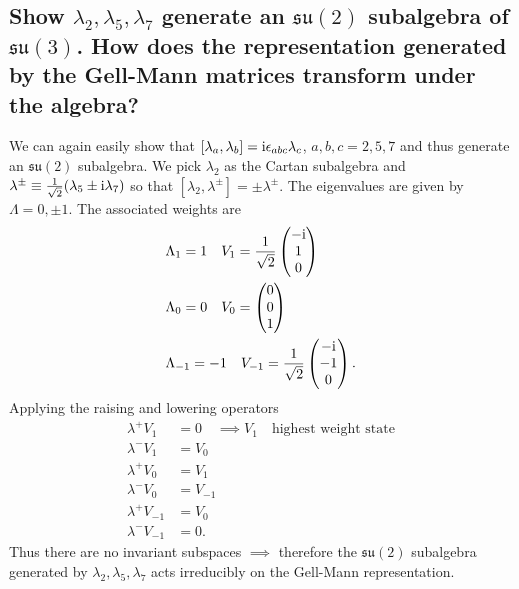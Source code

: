 \documentclass[main.tex]{subfiles}
\begin{document}
\subsection{Show $\lambda_2, \lambda_5, \lambda_7$ generate an $\mathfrak{su}(2)$ subalgebra of $\mathfrak{su}(3)$. How does the representation generated by the Gell-Mann matrices transform under the algebra?}
We can again easily show that $[\lambda_a,\lambda_b]=\mathrm{i} \epsilon_{abc}\lambda_c$, $a,b,c=2,5,7$ and thus generate an $\mathfrak{su}(2)$ subalgebra. We pick $\lambda_2$ as the Cartan subalgebra and $\lambda^{\pm}\equiv\frac{1}{\sqrt{2}}(\lambda_5\pm\mathrm{i}\lambda_7)$ so that $[\lambda_2,\lambda^{\pm}]=\pm\lambda^{\pm}$. The eigenvalues are given by $\Lambda=0,\pm1$. The associated weights are
\begin{align}
&\Lambda_1=1 \quad V_1= \frac{1}{\sqrt{2}}\begin{pmatrix}-\mathrm{i}\\1\\0\end{pmatrix}\\
&\Lambda_0=0 \quad V_0= \begin{pmatrix}0\\0\\1\end{pmatrix}\\
&\Lambda_{-1}=-1 \quad V_{-1}= \frac{1}{\sqrt{2}}\begin{pmatrix}-\mathrm{i}\\-1\\0\end{pmatrix}.
\end{align}
Applying the raising and lowering operators
\begin{align}
\lambda^+V_{1}&=0 \quad \implies V_{1} \quad\text{highest weight state}\\
\lambda^-V_{1}&=V_{0}\\
\lambda^+V_{0}&=V_{1}\\
\lambda^-V_{0}&=V_{-1}\\
\lambda^+V_{-1}&=V_{0}\\
\lambda^-V_{-1}&=0.
\end{align}
Thus there are no invariant subspaces $\implies$ therefore the $\mathfrak{su}(2)$ subalgebra generated by $\lambda_2, \lambda_5, \lambda_7$ acts irreducibly on the Gell-Mann representation.
\end{document}

